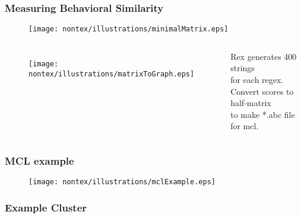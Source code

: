 
\begin{frame}
\frametitle{Measuring Behavioral Similarity}
\begin{figure}[ht]
  \centering
  \texttt{[image: nontex/illustrations/minimalMatrix.eps]}
  \label{fig:minimalMatrix}
\end{figure}

\begin{columns}[t] %
\begin{figure}[h]
  \centering
  \texttt{[image: nontex/illustrations/matrixToGraph.eps]}
  \label{fig:matrixToGraph}
\end{figure}
\begin{center}
Rex generates 400 strings\\
for each regex.\\
Convert scores to half-matrix\\
to make *.abc file for mcl.
\end{center}
\end{columns}
\end{frame}



\begin{frame}
\frametitle{MCL example}
\begin{figure}[ht]
  \centering
  \texttt{[image: nontex/illustrations/mclExample.eps]}
  \label{fig:minimalMatrix}
\end{figure}
\end{frame}


\begin{frame}[fragile]
\frametitle{Example Cluster}

\end{frame}

